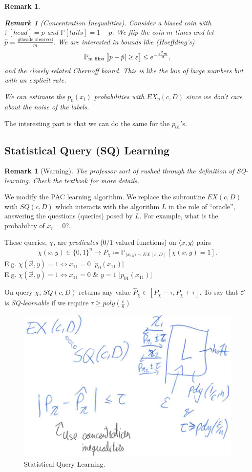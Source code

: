\documentclass[12pt, letterpaper]{article}
\numberwithin{equation}{section} %
\newcommand{\mb}{\mathbb}
\newcommand{\mc}{\mathcal}
\newcommand{\ve}{\varepsilon}
\newtheorem{remark}[theorem]{Remark}
\theoremstyle{definition}
\theoremstyle{remark}
\begin{document}
\begin{remark}
\begin{remark}[Concentration Inequalities]
Consider a biased coin with $\mb P[head] = p$ and $\mb P[tails]=1-p$. We flip the coin $m$ times and let $\hat p = \frac{\textrm{\# heads observed}}{m}$. We are interested in bounds like (Hoeffding's)
\begin{align}
\mb P_{\textrm{m flips}}\left[\abs{p-\hat p}\geq \ve\right] \leq e^{-\frac{\ve^2m}{3}},
\end{align}
and the closely related Chernoff bound. This is like the law of large numbers but with an explicit rate.
\end{remark}
We can estimate the $p_0(x_i)$ probabilities with $EX_\eta(c, D)$ since we don't care about the noise of the labels.
\end{remark}
The interesting part is that we can do the same for the $p_{01}$'s.

\subsection{Statistical Query (SQ) Learning}
\begin{remark}[Warning]
The professor sort of rushed through the definition of SQ-learning. Check the textbook for more details.
\end{remark}
We modify the PAC learning algorithm. We replace the subroutine $EX(c,D)$ with $SQ(c,D)$ which interacts with the algorithm $L$ in the role of ``oracle'', answering the questions (queries) posed by $L$. For example, what is the probability of $x_i=0$?.

These queries, $\chi$, are \emph{predicates} ($0/1$ valued functions) on $\langle x, y\rangle$ pairs
\begin{align}
\chi(x,y)\in \lbrace 0, 1\rbrace^n \longrightarrow P_{\chi} \coloneqq \mb P_{\langle x,y\rangle\sim EX(c,D)}[\chi(x,y)=1].
\end{align}
E.g. $\chi(\vec x, y) = 1 \iff x_{11}=0$ [$p_{0}(x_{11})$]\\
E.g. $\chi(\vec x, y) = 1 \iff x_{11}=0$ \& $y=1$ [$p_{01}(x_{11})$]

On query $\chi$, $SQ(c,D)$ returns any value $\hat P_\chi  \in \left[P_\chi -\tau, P_\chi +\tau\right]$. To say that $\mc C$ is \emph{SQ-learnable} if  we require $\tau \geq poly\left(\frac\ve n\right)$
\begin{figure}[H]
\centering
\includegraphics[width=0.6\linewidth]{../img/sq-learning.png}
\caption{Statistical Query Learning.}
\label{fig:graph}
\end{figure}
\end{document}

